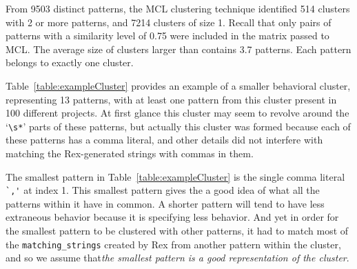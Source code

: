 From 9503 distinct patterns, the MCL clustering technique identified 514 clusters with 2 or more patterns, and 7214 clusters of size 1.  Recall that only pairs of patterns with a similarity level of 0.75 were included in the matrix passed to MCL.  The average size of clusters larger than contains 3.7 patterns.
Each pattern belongs to exactly one cluster.


Table~\ref{table:exampleCluster} provides an example of a smaller behavioral cluster, representing 13 patterns, with at least one pattern from this cluster present in 100 different projects.  At first glance this cluster may seem to revolve around the `\verb!\s*!' parts of these patterns, but actually this cluster was formed because each of these patterns has a comma literal, and other details did not interfere with matching the Rex-generated strings with commas in them.


The smallest pattern in Table~\ref{table:exampleCluster} is the single comma literal \verb!`,'! at index 1.  This smallest pattern gives the a good idea of what all the patterns within it have in common.  A shorter pattern will tend to have less extraneous behavior because it is specifying less behavior.  And yet in order for the smallest pattern to be clustered with other patterns, it had to match most of the {\tt matching\_strings} created by Rex from another pattern within the cluster, and so we assume that\emph{the smallest pattern is a good representation of the cluster}.

